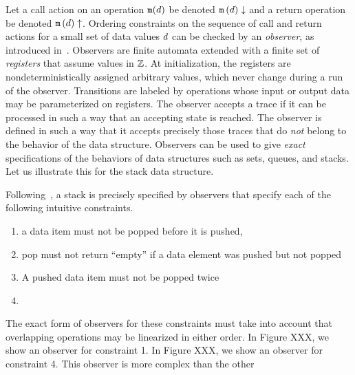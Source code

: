 Let a call action on an operation ${\tt m}(d)$ be denoted
${\tt m}\left(d\right)\downarrow$ and a return operation be denoted
${\tt m}\left(d\right)\uparrow$. Ordering constraints on the sequence of
call and return actions for a small set of data values $d$ can be
checked by an {\em observer},
as introduced in~\cite{AHHR:integrated}. 
%
Observers are
finite automata extended with a finite set of {\em registers}
that assume values in ${\mathbb Z}$. 
%
At initialization,
the registers are nondeterministically
assigned arbitrary values, which never change
during a run of the observer. 
%
Transitions are labeled by 
operations whose input or output data may be parameterized on registers.
%
%
The observer accepts a trace if it can  be processed in such a way that
an accepting state is reached.
%
The observer is defined in such a way that it accepts precisely those
traces that do {\em not} belong to the behavior
of the data structure.
% 
Observers can be used to give {\it exact} specifications of
the behaviors of data structures such as sets, queues, and stacks.
%
%
Let us illustrate this for the stack data structure.

Following~\cite{BEEH:icalp15}, a stack is precisely specified by observers
that specify each of the following intuitive constraints.
\begin{enumerate}
\item a data item must not be popped before it is pushed,
\item pop must not return ``empty'' if a data element was pushed but not
  popped
\item A pushed data item must not be popped twice
\item {}
\end{enumerate}
The exact form of observers for these constraints must take into account
that overlapping operations may be linearized in either order.
In Figure XXX, we show an observer for constraint 1.
In Figure XXX, we show an observer for constraint 4. This observer is
more complex than the other 


